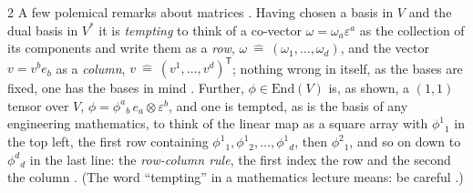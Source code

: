 \begin{paracol}{2}
A few polemical remarks about matrices . Having chosen a basis in $V$ and the dual basis in $V^*$ it is \emph{tempting} to think of a co-vector $\omega=\omega_a\varepsilon^a$ as the collection of its components and write them as a \emph{row}, $\omega\ \hat=\ (\omega_1,\dots,\omega_d)$, and the vector $v=v^be_b$ as a \emph{column},
$v\ \hat=\ (v^1,\dots,v^d)^{\mathsf T}$; nothing wrong in itself, as the bases are fixed, one has the bases in mind .
Further, $\phi\in\mathrm{End}(V)$ is, as shown, a $(1,1)$ tensor over $V$, $\phi=\phi^a{}_b\,e_a\otimes\varepsilon^b$, and one is tempted, as is the basis of any engineering mathematics, to think of the linear map as a square array with $\phi^1{}_1$ in the top left, the first row containing $\phi^1{}_1,\phi^1{}_2,\dots,\phi^1{}_d$,
then $\phi^2{}_1$, and so on down to $\phi^d{}_d$ in the last line: the \emph{row-column rule}, the first index the row and the second the column .
(The word ``tempting'' in a mathematics lecture means: be careful .)


\end{paracol}
